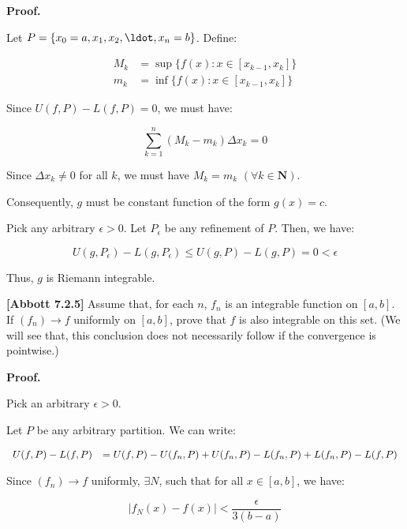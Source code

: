 \documentclass[10pt]{article}
\begin{document}
\textbf{Proof.}



Let $P = \{x_0=a,x_1,x_2,\ldot,x_n=b\}$. Define:

\begin{align*}
M_k &= \sup \{f(x):x \in [x_{k-1},x_k]\}\\
m_k &= \inf \{f(x):x \in [x_{k-1},x_k]\}
\end{align*}

Since $U(f,P) - L(f,P) = 0$, we must have:

$$\sum_{k=1}^{n}(M_k - m_k)\Delta x_k = 0$$

Since $\Delta x_k \neq 0$ for all $k$, we must have $M_k = m_k$ $(\forall k \in \mathbf{N})$.

Consequently, $g$ must be constant function of the form $g(x) = c$. 

Pick any arbitrary $\epsilon > 0$. Let $P_\epsilon$ be any refinement of $P$. Then, we have:

$$U(g,P_\epsilon) - L(g,P_\epsilon) \leq U(g,P) - L(g,P) = 0 < \epsilon$$

Thus, $g$ is Riemann integrable.

\textbf{[Abbott 7.2.5]} Assume that, for each $\displaystyle n$, $\displaystyle f_{n}$ is an integrable function on $\displaystyle [ a,b]$. If $\displaystyle ( f_{n})\rightarrow f$ uniformly on $\displaystyle [ a,b]$, prove that $\displaystyle f$ is also integrable on this set. (We will see that, this conclusion does not necessarily follow if the convergence is pointwise.)



\textbf{Proof.}



Pick an arbitrary $\displaystyle \epsilon  >0$. 



Let $\displaystyle P$ be any arbitrary partition. We can write:


\begin{equation*}
\begin{array}{ c l }
U( f,P) -L( f,P) & =U( f,P) -U( f_{n} ,P) +U( f_{n} ,P) -L( f_{n} ,P) +L( f_{n} ,P) -L( f,P)
\end{array}
\end{equation*}




Since $\displaystyle ( f_{n})\rightarrow f$ uniformly, $\displaystyle \exists N$, such that for all $\displaystyle x\in [ a,b]$, we have:


\begin{equation*}
|f_{N}( x) -f( x) |< \frac{\epsilon }{3( b-a)}
\end{equation*}
\end{document}
